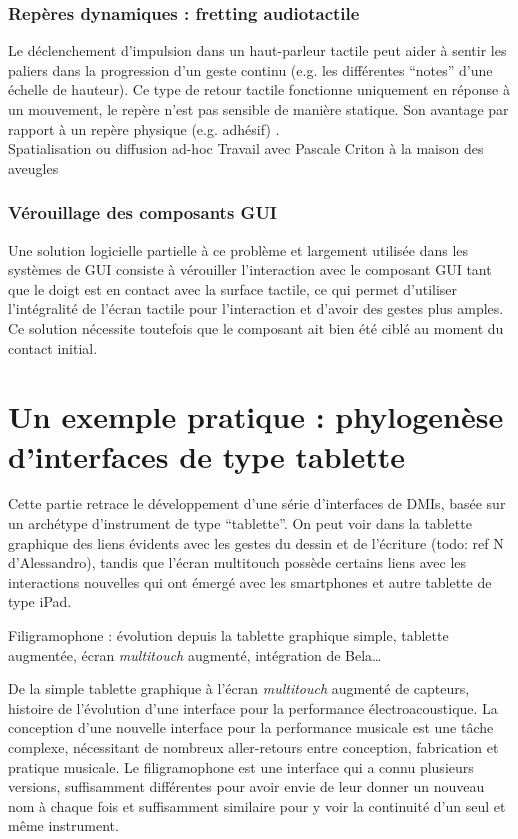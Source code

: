 \subsubsection{Repères dynamiques : fretting audiotactile}
\label{sec:audio-fretting}
\noindent Le déclenchement d'impulsion dans un haut-parleur tactile peut aider à sentir les paliers dans la progression d'un geste continu (e.g. les différentes ``notes'' d'une échelle de hauteur). Ce type de retour tactile fonctionne uniquement en réponse à un mouvement, le repère n'est pas sensible de manière statique. Son avantage par rapport à un repère physique (e.g. adhésif) .\\

Spatialisation ou diffusion ad-hoc
Travail avec Pascale Criton à la maison des aveugles

\subsubsection{Vérouillage des composants GUI}
\noindent Une solution logicielle partielle à ce problème et largement utilisée dans les systèmes de \gls{GUI} consiste à vérouiller l'interaction avec le composant GUI tant que le doigt est en contact avec la surface tactile, ce qui permet d'utiliser l'intégralité de l'écran tactile pour l'interaction et d'avoir des gestes plus amples. Ce solution nécessite toutefois que le composant ait bien été ciblé au moment du contact initial.




\section{Un exemple pratique : phylogenèse d'interfaces de type tablette}
\label{sec:interfaces:phylogenese}

\noindent Cette partie retrace le développement d'une série d'interfaces de \glspl{DMI}, basée sur un archétype d'instrument de type ``tablette''. On peut voir dans la tablette graphique des liens évidents avec les gestes du dessin et de l'écriture (todo: ref N d'Alessandro), tandis que l'écran multitouch possède certains liens avec les interactions nouvelles qui ont émergé avec les smartphones et autre tablette de type iPad.

Filigramophone : évolution depuis la tablette graphique simple, tablette augmentée, écran \textit{multitouch} augmenté, intégration de Bela…

De la simple tablette graphique à l’écran \textit{multitouch} augmenté de capteurs, histoire de l’évolution d’une interface pour la performance électroacoustique.
La conception d’une nouvelle interface pour la performance musicale est une tâche complexe, nécessitant de nombreux aller-retours entre conception, fabrication et pratique musicale. Le filigramophone est une interface qui a connu plusieurs versions, suffisamment différentes pour avoir envie de leur donner un nouveau nom à chaque fois et suffisamment similaire pour y voir la continuité d’un seul et même instrument.


